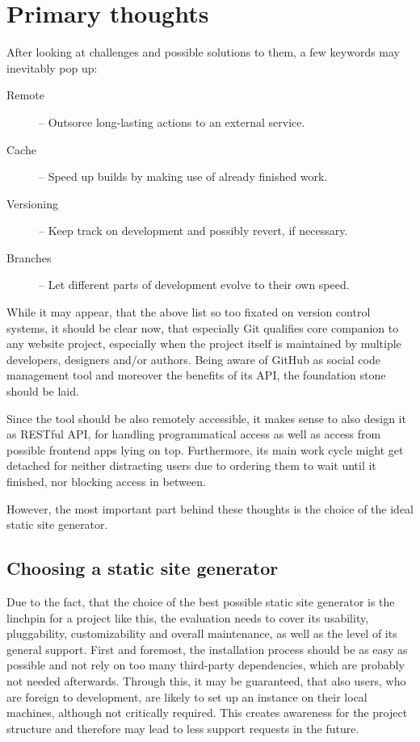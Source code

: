 \section{Primary thoughts}
\label{sec:primarythoughts}

After looking at challenges and possible solutions to them, a few keywords may inevitably pop up:

\begin{description}
  \item[Remote] -- Outsorce long-lasting actions to an external service.
  \item[Cache] -- Speed up builds by making use of already finished work.
  \item[Versioning] -- Keep track on development and possibly revert, if necessary.
  \item[Branches] -- Let different parts of development evolve to their own speed.
\end{description}

While it may appear, that the above list so too fixated on version control systems, it should be clear now, that especially Git qualifies core companion to any website project, especially when the project itself is maintained by multiple developers, designers and/or authors. Being aware of GitHub as social code management tool and moreover the benefits of its API, the foundation stone should be laid.

Since the tool should be also remotely accessible, it makes sense to also design it as RESTful API, for handling programmatical access as well as access from possible frontend apps lying on top. Furthermore, its main work cycle might get detached for neither distracting users due to ordering them to wait until it finished, nor blocking access in between.

However, the most important part behind these thoughts is the choice of the ideal static site generator.


\subsection{Choosing a static site generator}
\label{sec:primarythoughts-generator}

Due to the fact, that the choice of the best possible static site generator is the linchpin for a project like this, the evaluation needs to cover its usability, pluggability, customizability and overall maintenance, as well as the level of its general support. First and foremost, the installation process should be as easy as possible and not rely on too many third-party dependencies, which are probably not needed afterwards. Through this, it may be guaranteed, that also users, who are foreign to development, are likely to set up an instance on their local machines, although not critically required. This creates awareness for the project structure and therefore may lead to less support requests in the future.

